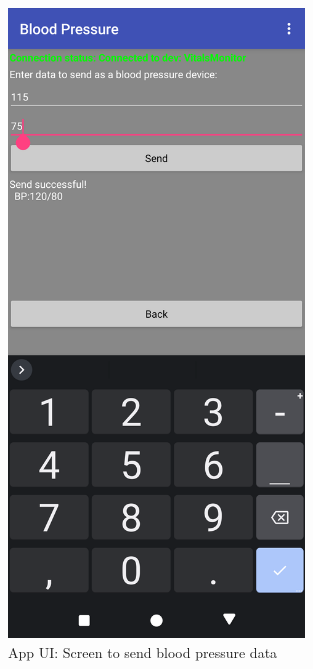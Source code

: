 \newpage
\begin{figure}[H]
	\centering
	\includegraphics[width=0.7\textwidth]{images/app_ui_send_bp}
	\caption{App UI: Screen to send blood pressure data}
	\label{appendix:app_ui_bp}
\end{figure}

